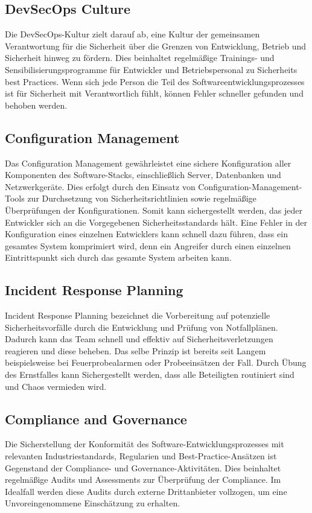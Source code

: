 \subsection{DevSecOps Culture}
Die DevSecOps-Kultur zielt darauf ab, eine Kultur der gemeinsamen Verantwortung für die Sicherheit über die Grenzen von Entwicklung, Betrieb und Sicherheit hinweg zu fördern. Dies beinhaltet regelmäßige Trainings- und Sensibilisierungsprogramme für Entwickler und Betriebspersonal zu Sicherheits best Practices. Wenn sich jede Person die Teil des Softwareentwicklungsprozesses ist für Sicherheit mit Verantwortlich fühlt, können Fehler schneller gefunden und behoben werden.

\subsection{Configuration Management}
Das Configuration Management gewährleistet eine sichere Konfiguration aller Komponenten des Software-Stacks, einschließlich Server, Datenbanken und Netzwerkgeräte. Dies erfolgt durch den Einsatz von Configuration-Management-Tools zur Durchsetzung von Sicherheitsrichtlinien sowie regelmäßige Überprüfungen der Konfigurationen. Somit kann sichergestellt werden, das jeder Entwickler sich an die Vorgegebenen Sicherheitsstandards hält. Eine Fehler in der Konfiguration eines einzelnen Entwicklers kann schnell dazu führen, dass ein gesamtes System komprimiert wird, denn ein Angreifer durch einen einzelnen Eintrittspunkt sich durch das gesamte System arbeiten kann.

\subsection{Incident Response Planning}
Incident Response Planning bezeichnet die Vorbereitung auf potenzielle Sicherheitsvorfälle durch die Entwicklung und Prüfung von Notfallplänen. Dadurch kann das Team schnell und effektiv auf Sicherheitsverletzungen reagieren und diese beheben. Das selbe Prinzip ist bereits seit Langem beispielsweise bei Feuerprobealarmen oder Probeeinsätzen der Fall. Durch Übung des Ernstfalles kann Sichergestellt werden, dass alle Beteiligten routiniert sind und Chaos vermieden wird.


\subsection{Compliance and Governance}	
Die Sicherstellung der Konformität des Software-Entwicklungsprozesses mit relevanten Industriestandards, Regularien und Best-Practice-Ansätzen ist Gegenstand der Compliance- und Governance-Aktivitäten. Dies beinhaltet regelmäßige Audits und Assessments zur Überprüfung der Compliance. Im Idealfall werden diese Audits durch externe Drittanbieter vollzogen, um eine Unvoreingenommene Einschätzung zu erhalten.